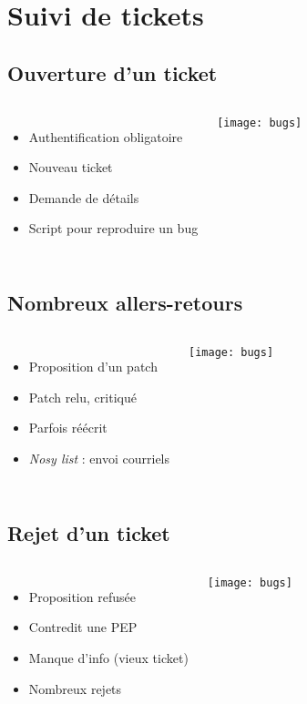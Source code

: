 \documentclass[handout]{beamer}
\begin{document}
\section{Suivi de tickets}

\subsection{Ouverture d'un ticket}
\frame
{
    \begin{columns}[c]
            \begin{itemize}
            \item Authentification obligatoire
            \item Nouveau ticket
            \item Demande de détails
            \item Script pour reproduire un bug
            \end{itemize}
            \texttt{[image: bugs]}
    \end{columns}
}

\subsection{Nombreux allers-retours}
\frame
{
    \begin{columns}[c]
            \begin{itemize}
            \item Proposition d'un patch
            \item Patch relu, critiqué
            \item Parfois réécrit
            \item \textit{Nosy list} : envoi courriels
            \end{itemize}
            \texttt{[image: bugs]}
    \end{columns}
}

\subsection{Rejet d'un ticket}
\frame
{
    \begin{columns}[c]
            \begin{itemize}
            \item Proposition refusée
            \item Contredit une PEP
            \item Manque d'info (vieux ticket)
            \item Nombreux rejets
            \end{itemize}
            \texttt{[image: bugs]}
    \end{columns}
}
\end{document}

